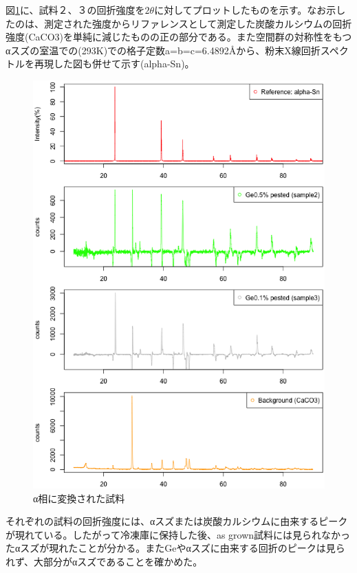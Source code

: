 図\ref{fig:intensity_pested_samples}に、試料２、３の回折強度を$2\theta$に対してプロットしたものを示す。なお示したのは、測定された強度からリファレンスとして測定した炭酸カルシウムの回折強度(CaCO3)を単純に減じたものの正の部分である。また空間群$$の対称性をもつαスズの室温での(293K)での格子定数a=b=c=6.4892\AA \cite{THEWLIS}から、粉末X線回折スペクトルを再現した図も併せて示す(alpha-Sn)。
\begin{figure}[htb]
    \begin{center}
   \includegraphics[width=150mm]{results_discussions/intensity_pested_samples.eps}
  \end{center}
  \caption{α相に変換された試料}
  \label{fig:intensity_pested_samples}
\end{figure}

それぞれの試料の回折強度には、αスズまたは炭酸カルシウムに由来するピークが現れている。したがって冷凍庫に保持した後、as grown試料には見られなかったαスズが現れたことが分かる。またGeやαスズに由来する回折のピークは見られず、大部分がαスズであることを確かめた。


